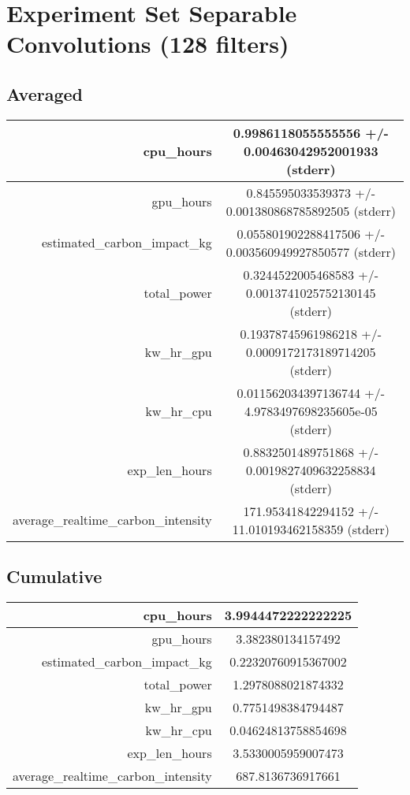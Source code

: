 \documentclass{article}%
\begin{document}
%
\normalsize%
\section{Experiment Set Separable Convolutions (128 filters)}%
\label{sec:Experiment Set Separable Convolutions (128 filters)}%
\subsection{Averaged}%
\label{subsec:Averaged}%
\begin{tabular}{|r|c|}%
\hline%
cpu\_hours&0.9986118055555556 +/{-} 0.00463042952001933 (stderr)\\%
\hline%
gpu\_hours&0.845595033539373 +/{-} 0.001380868785892505 (stderr)\\%
\hline%
estimated\_carbon\_impact\_kg&0.055801902288417506 +/{-} 0.003560949927850577 (stderr)\\%
\hline%
total\_power&0.3244522005468583 +/{-} 0.0013741025752130145 (stderr)\\%
\hline%
kw\_hr\_gpu&0.19378745961986218 +/{-} 0.0009172173189714205 (stderr)\\%
\hline%
kw\_hr\_cpu&0.011562034397136744 +/{-} 4.9783497698235605e{-}05 (stderr)\\%
\hline%
exp\_len\_hours&0.8832501489751868 +/{-} 0.0019827409632258834 (stderr)\\%
\hline%
average\_realtime\_carbon\_intensity&171.95341842294152 +/{-} 11.010193462158359 (stderr)\\%
\hline%
\end{tabular}

%
\subsection{Cumulative}%
\label{subsec:Cumulative}%
\begin{tabular}{|r|c|}%
\hline%
cpu\_hours&3.9944472222222225\\%
\hline%
gpu\_hours&3.382380134157492\\%
\hline%
estimated\_carbon\_impact\_kg&0.22320760915367002\\%
\hline%
total\_power&1.2978088021874332\\%
\hline%
kw\_hr\_gpu&0.7751498384794487\\%
\hline%
kw\_hr\_cpu&0.04624813758854698\\%
\hline%
exp\_len\_hours&3.5330005959007473\\%
\hline%
average\_realtime\_carbon\_intensity&687.8136736917661\\%
\hline%
\end{tabular}

%
\end{document}
